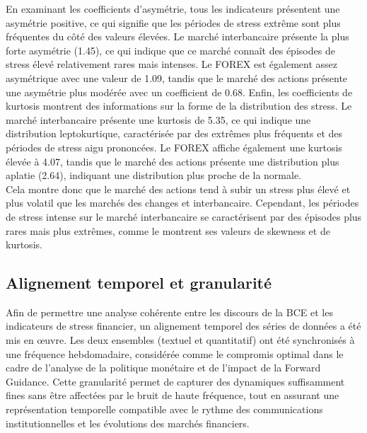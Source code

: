 En examinant les coefficients d'asymétrie, tous les indicateurs présentent une asymétrie positive, ce qui signifie que les périodes de stress extrême sont plus fréquentes du côté des valeurs élevées. Le marché interbancaire présente la plus forte asymétrie (1.45), ce qui indique que ce marché connaît des épisodes de stress élevé relativement rares mais intenses. Le FOREX est également assez asymétrique avec une valeur de 1.09, tandis que le marché des actions présente une asymétrie plus modérée avec un coefficient de 0.68. Enfin, les coefficients de kurtosis montrent des informations sur la forme de la distribution des stress. Le marché interbancaire présente une kurtosis de 5.35, ce qui indique une distribution leptokurtique, caractérisée par des extrêmes plus fréquents et des périodes de stress aigu prononcées. Le FOREX affiche également une kurtosis élevée à 4.07, tandis que le marché des actions présente une distribution plus aplatie (2.64), indiquant une distribution plus proche de la normale.\\

Cela montre donc que le marché des actions tend à subir un stress plus élevé et plus volatil que les marchés des changes et interbancaire. Cependant, les périodes de stress intense sur le marché interbancaire se caractérisent par des épisodes plus rares mais plus extrêmes, comme le montrent ses valeurs de skewness et de kurtosis.

\subsection{Alignement temporel et granularité}

Afin de permettre une analyse cohérente entre les discours de la BCE et les indicateurs de stress financier, un alignement temporel des séries de données a été mis en œuvre. Les deux ensembles (textuel et quantitatif) ont été synchronisés à une fréquence hebdomadaire, considérée comme le compromis optimal dans le cadre de l’analyse de la politique monétaire et de l’impact de la Forward Guidance. Cette granularité permet de capturer des dynamiques suffisamment fines sans être affectées par le bruit de haute fréquence, tout en assurant une représentation temporelle compatible avec le rythme des communications institutionnelles et les évolutions des marchés financiers.\\

